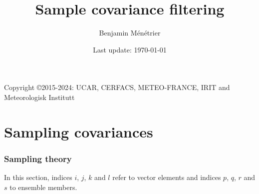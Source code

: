 \documentclass[12pt]{scrartcl}
\begin{document}
\title{Sample covariance filtering}
\author{Benjamin Ménétrier}
\date{Last update: \today}

\thispagestyle{empty}

\maketitle
\begin{center}
Copyright \copyright 2015-2024: UCAR, CERFACS, METEO-FRANCE, IRIT and Meteorologisk Institutt
\end{center}

\tableofcontents

\clearpage

\part{Sampling covariances}

\section{Sampling theory}

In this section, indices $i$, $j$, $k$ and $l$ refer to vector elements and indices $p$, $q$, $r$ and $s$ to ensemble members.
\end{document}
